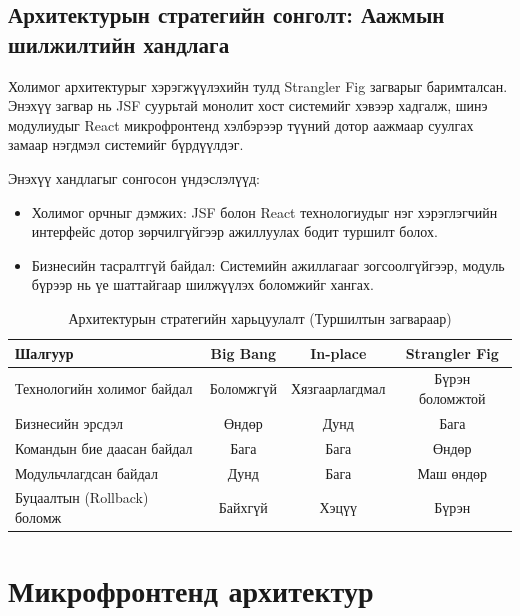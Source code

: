 \subsection{Архитектурын стратегийн сонголт: Аажмын шилжилтийн хандлага}

Холимог архитектурыг хэрэгжүүлэхийн тулд Strangler Fig \cite{fowler_strangler} загварыг баримталсан. Энэхүү загвар нь JSF суурьтай монолит хост системийг хэвээр хадгалж, шинэ модулиудыг React микрофронтенд хэлбэрээр түүний дотор аажмаар суулгах замаар нэгдмэл системийг бүрдүүлдэг.

Энэхүү хандлагыг сонгосон үндэслэлүүд:
\begin{itemize}
    \item Холимог орчныг дэмжих: JSF болон React технологиудыг нэг хэрэглэгчийн интерфейс дотор зөрчилгүйгээр ажиллуулах бодит туршилт болох.
    \item Бизнесийн тасралтгүй байдал: Системийн ажиллагааг зогсоолгүйгээр, модуль бүрээр нь үе шаттайгаар шилжүүлэх боломжийг хангах.
\end{itemize}

\begin{table}[H]
    \centering
    \caption{Архитектурын стратегийн харьцуулалт (Туршилтын загвараар)}
    \label{tab:arch_strategy}
    \renewcommand{\arraystretch}{1}
    \begin{tabular}{lccc}
        \toprule
        \textbf{Шалгуур} & \textbf{Big Bang} & \textbf{In-place} & \textbf{Strangler Fig} \\
        \midrule
        Технологийн холимог байдал     & Боломжгүй  & Хязгаарлагдмал   & Бүрэн боломжтой \\
        Бизнесийн эрсдэл               & Өндөр      & Дунд             & Бага            \\
        Командын бие даасан байдал     & Бага       & Бага             & Өндөр           \\
        Модульчлагдсан байдал          & Дунд       & Бага             & Маш өндөр       \\
        Буцаалтын (Rollback) боломж    & Байхгүй    & Хэцүү            & Бүрэн           \\
        \bottomrule
    \end{tabular}
\end{table}
\section{Микрофронтенд архитектур}

